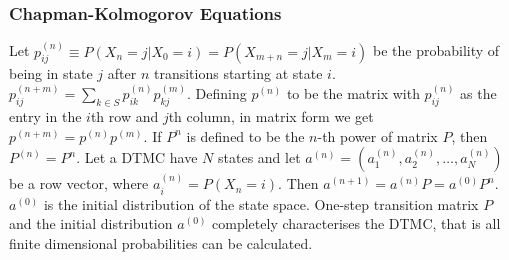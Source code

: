 \subsubsection*{Chapman-Kolmogorov Equations}
 Let $p^{(n)}_{ij} \equiv P(X_n = j|X_0 = i) = P(X_{m+n} = j | X_m = i)$ be the probability of being in state $j$ after $n$ transitions starting at state $i$.
 $p^{(n+m)}_{ij} = \sum_{k \in S}p^{(n)}_{ik}p^{(m)}_{kj}$. Defining $p^{(n)}$ to be the matrix with $p^{(n)}_{ij}$ as the entry in the $i$th row and $j$th column, in matrix form we get $p^{(n+m)} = p^{(n)}p^{(m)}.$
 If $P^n$ is defined to be the $n$-th power of matrix $P$, then $P^{(n)} = P^n$.
 Let a DTMC have $N$ states and let $a^{(n)} = (a^{(n)}_1, a^{(n)}_2, \ldots, a^{(n)}_N)$ be a row vector, where $a^{(n)}_i = P(X_n = i)$. Then $a^{(n+1)} = a^{(n)}P = a^{(0)}P^n$. $a^{(0)}$ is the initial distribution of the state space.
 One-step transition matrix $P$ and the initial distribution $a^{(0)}$ completely characterises the DTMC, that is all finite dimensional probabilities can be calculated.